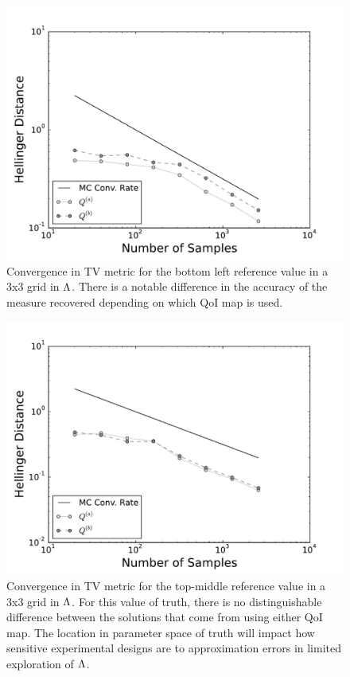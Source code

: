 \begin{figure}[h]
  \includegraphics[width=\linewidth]{./images/pt0Plot-reg_BigN_40000_reg_M_1_rand_I_100000}
  \caption{Convergence in TV metric for the bottom left reference value in a 3x3 grid in ${\Lambda}$. There is a notable difference in the accuracy of the measure recovered depending on which QoI map is used.}
  \label{fig:NLbotleft}
\end{figure}

\begin{figure}[h]
  \includegraphics[width=\linewidth]{./images/pt5Plot-reg_BigN_40000_reg_M_1_rand_I_100000}
  \caption{Convergence in TV metric for the top-middle reference value in a 3x3 grid in ${\Lambda}$. For this value of truth, there is no distinguishable difference between the solutions that come from using either QoI map. The location in parameter space of truth will impact how sensitive experimental designs are to approximation errors in limited exploration of ${\Lambda}$.}
  \label{fig:NLtopmid}
\end{figure}


